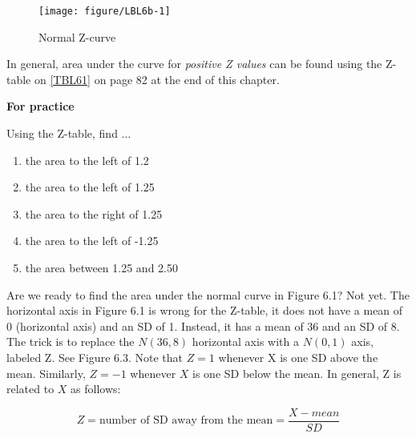\documentclass[11pt]{book}\usepackage[]{graphicx}\usepackage[]{color}
\begin{document}
\begin{figure}[ht]
\caption{Normal Z-curve}



{\centering \texttt{[image: figure/LBL6b-1]} 

}



\end{figure}

In general, area under the curve for \textit{positive Z values} can be found using the Z-table on \ref{TBL61} on page 82 at the end of this chapter.  

\begin{minipage}[ht]{3cm}

\textbf{For practice}
\end{minipage}
\begin{minipage}[ht]{6cm}

\parbox{58mm}{
  Using the Z-table, find $\dots$

  \begin{enumerate}
  \item the area to the left of 1.2
  \item the area to the left of 1.25
  \item the area to the right of 1.25
  \item the area to the left of -1.25
  \item the area between 1.25 and 2.50
  \end{enumerate}
}
\end{minipage}

Are we ready to find the area under the normal curve in Figure 6.1?  Not yet.  The horizontal axis in Figure 6.1 is wrong for the Z-table, it does not have a mean of 0 (horizontal axis) and an SD of 1. Instead, it has a mean of 36 and an SD of 8.  The trick is to replace the $N(36, 8)$ horizontal axis with a $N(0, 1)$ axis, labeled Z.  See Figure 6.3.  Note that $Z = 1$ whenever X is one SD above the mean.  Similarly, $Z = -1$ whenever $X$ is one SD below the mean.  In general, Z is related to $X$ as follows:

  \begin{equation} Z = \text{number of SD away from the mean} = \frac{X - mean}{SD} \end{equation}
\end{document}
